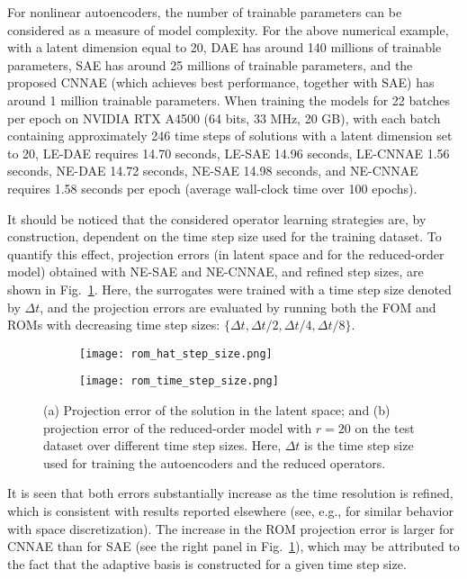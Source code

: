 For nonlinear autoencoders, the number of trainable parameters can be considered as a measure of model complexity. For the above numerical example, with a latent dimension equal to 20, DAE has around 140 millions of trainable parameters, SAE has around 25 millions of trainable parameters, and the proposed CNNAE (which achieves best performance, together with SAE) has around 1 million trainable parameters. When training the models for 22 batches per epoch on NVIDIA RTX A4500 (64 bits, 33 MHz, 20 GB), with each batch containing approximately 246 time steps of solutions with a latent dimension set to 20, LE-DAE requires 14.70 seconds, LE-SAE 14.96 seconds, LE-CNNAE 1.56 seconds, NE-DAE 14.72 seconds, NE-SAE 14.98 seconds, and NE-CNNAE requires 1.58 seconds per epoch (average wall-clock time over 100 epochs).

It should be noticed that the considered operator learning strategies are, by construction, dependent on the time step size used for the training dataset. To quantify this effect, projection errors (in latent space and for the reduced-order model) obtained with NE-SAE and NE-CNNAE, and refined step sizes, are shown in Fig.~\ref{fig: time step size dependency}. Here, the surrogates were trained with a time step size denoted by $\Delta t$, and the projection errors are evaluated by running both the FOM and ROMs with decreasing time step sizes: $\{\Delta t, \Delta t / 2, \Delta t / 4, \Delta t / 8\}$.
\begin{figure}[!htb]
     \begin{center}
        \begin{subfigure}[b]{0.49\textwidth}
            \begin{center}
                \texttt{[image: rom\_hat\_step\_size.png]}
            \end{center}
            \caption{}
        \end{subfigure}
        \begin{subfigure}[b]{0.49\textwidth}
            \begin{center}
                \texttt{[image: rom\_time\_step\_size.png]}
            \end{center}
            \caption{}
        \end{subfigure}
     \end{center}
        \caption[Time step-size dependency.]{(a) Projection error of the solution in the latent space; and (b) projection error of the reduced-order model  with $r = 20$ on the test dataset over different time step sizes. Here, $\Delta t$ is the time step size used for training the autoencoders and the reduced operators.}
        \label{fig: time step size dependency}
\end{figure}
It is seen that both errors substantially increase as the time resolution is refined, which is consistent with results reported elsewhere (see, e.g., \cite{ZHU2018415} for similar behavior with space discretization). The increase in the ROM projection error is larger for CNNAE than for SAE (see the right panel in Fig.~\ref{fig: time step size dependency}), which may be attributed to the fact that the adaptive basis is constructed for a given time step size.